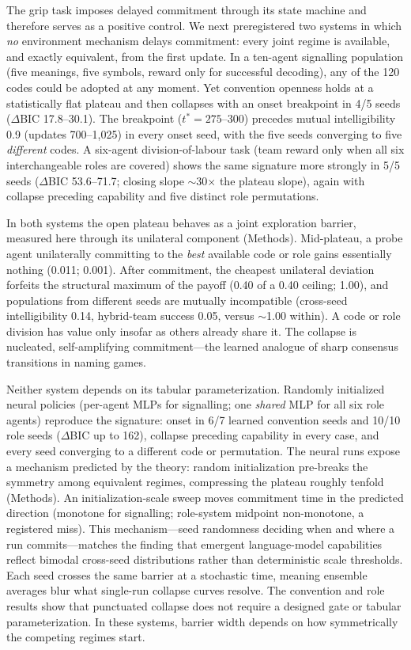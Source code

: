 \documentclass[11pt]{article}
\begin{document}
The grip task imposes delayed commitment through its state machine and
therefore serves as a positive control. We next preregistered two
systems in
which \emph{no} environment mechanism delays commitment: every joint
regime is available, and exactly equivalent, from the first update. In
a ten-agent signalling population (five meanings, five symbols, reward
only for successful decoding\citep{lewis1969convention}), any of the
120 codes could be adopted at any moment. Yet convention openness
holds at a statistically flat plateau and then collapses with an onset
breakpoint in 4/5 seeds ($\Delta$BIC 17.8--30.1). The breakpoint
($t^{*}=275$--$300$) precedes mutual intelligibility 0.9 (updates
700--1{,}025) in every onset seed, with the five seeds converging to
five \emph{different} codes. A six-agent division-of-labour task
(team reward only when all six interchangeable roles are covered)
shows the same signature more strongly in 5/5 seeds ($\Delta$BIC
53.6--71.7; closing slope $\sim$30$\times$ the plateau slope), again
with collapse preceding capability and five distinct role
permutations.

In both systems the open plateau behaves as a joint exploration
barrier, measured here through its unilateral component (Methods).
Mid-plateau, a probe agent
unilaterally committing to the \emph{best} available code or role
gains essentially nothing (0.011; 0.001). After commitment, the
cheapest unilateral deviation forfeits the structural maximum of the
payoff (0.40 of a 0.40 ceiling; 1.00), and populations from different
seeds are mutually incompatible (cross-seed intelligibility 0.14,
hybrid-team success 0.05, versus $\sim$1.00 within). A code or role
division has value only insofar as others already share it. The
collapse is nucleated, self-amplifying commitment---the learned
analogue of sharp consensus transitions in naming
games\citep{baronchelli2006sharp,centola2015spontaneous}.

Neither system depends on its tabular parameterization. Randomly initialized
neural policies (per-agent MLPs for signalling; one \emph{shared} MLP
for all six role agents) reproduce the signature: onset in 6/7
learned convention seeds and 10/10 role seeds ($\Delta$BIC up to
162), collapse preceding capability in every case, and every seed
converging to a different code or permutation. The
neural runs expose a mechanism predicted by the theory: random
initialization pre-breaks the symmetry among equivalent regimes,
compressing the plateau roughly tenfold (Methods). An
initialization-scale sweep moves commitment time in the predicted
direction (monotone for signalling; role-system midpoint non-monotone,
a registered miss). This mechanism---seed
randomness deciding when and where a run commits---matches the
finding that emergent language-model capabilities reflect bimodal
cross-seed distributions rather than deterministic scale
thresholds\citep{zhao2025random}.
Each seed crosses the same barrier at a stochastic time, meaning ensemble
averages blur what single-run collapse curves resolve. The convention
and role results show that punctuated collapse does not require a
designed gate or tabular parameterization. In these systems, barrier
width depends on how symmetrically the competing regimes start.
\end{document}
